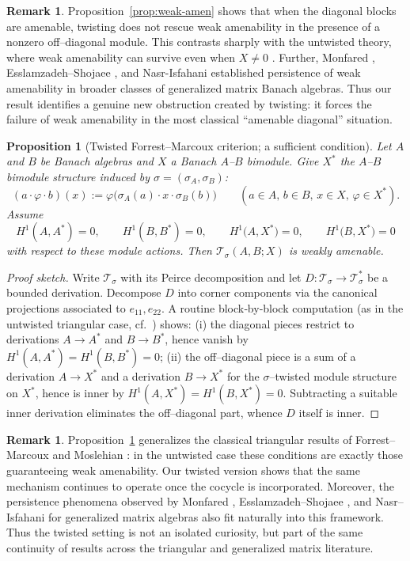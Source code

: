 \documentclass{article}
\theoremstyle{plain}
\newtheorem{prop}[theorem]{Proposition}
\theoremstyle{definition}
\newtheorem{remark}[theorem]{Remark}
\newcommand{\T}{\mathcal{T}}
\begin{document}
\begin{remark}
Proposition~\ref{prop:weak-amen} shows that when the diagonal blocks are
amenable, twisting does not rescue weak amenability in the presence of a
nonzero off--diagonal module.
This contrasts sharply with the untwisted theory, where weak amenability
can survive even when $X\neq 0$
\cite{ForrestMarcouxWA,MoslehianTriangular}.
Further, Monfared \cite{Monfared2008}, Esslamzadeh--Shojaee
\cite{EsslamzadehShojaee2011}, and Nasr-Isfahani \cite{NasrIsfahani2013}
established persistence of weak amenability in broader classes of
generalized matrix Banach algebras.
Thus our result identifies a genuine new obstruction created by twisting:
it forces the failure of weak amenability in the most classical
“amenable diagonal” situation.
\end{remark}
\begin{prop}[Twisted Forrest–Marcoux criterion; a sufficient condition]\label{prop:WA-sufficient}
Let $A$ and $B$ be Banach algebras and $X$ a Banach $A$--$B$ bimodule.
Give $X^*$ the $A$--$B$ bimodule structure induced by $\sigma=(\sigma_A,\sigma_B)$:
\[
(a\cdot\varphi\cdot b)(x):=\varphi\bigl(\sigma_A(a)\cdot x\cdot \sigma_B(b)\bigr)\qquad(a\in A,\,b\in B,\,x\in X,\,\varphi\in X^*).
\]
Assume
\[
H^1(A,A^*)=0,\qquad H^1(B,B^*)=0,\qquad H^1\bigl(A,X^*\bigr)=0,\qquad H^1\bigl(B,X^*\bigr)=0
\]
with respect to these module actions. Then $\T_\sigma(A,B;X)$ is weakly amenable.
\end{prop}

\begin{proof}[Proof sketch]
Write $\T_\sigma$ with its Peirce decomposition and let $D:\T_\sigma\to \T_\sigma^*$ be a bounded derivation.
Decompose $D$ into corner components via the canonical projections associated to $e_{11},e_{22}$.
A routine block‐by‐block computation (as in the untwisted triangular case, cf.\ \cite{ForrestMarcouxWA,MoslehianTriangular}) shows:
(i) the diagonal pieces restrict to derivations $A\to A^*$ and $B\to B^*$, hence vanish by $H^1(A,A^*)=H^1(B,B^*)=0$; 
(ii) the off–diagonal piece is a sum of a derivation $A\to X^*$ and a derivation $B\to X^*$ for the $\sigma$–twisted module structure on $X^*$, hence is inner by $H^1(A,X^*)=H^1(B,X^*)=0$.
Subtracting a suitable inner derivation eliminates the off–diagonal part, whence $D$ itself is inner.
\end{proof}
\begin{remark}
Proposition~\ref{prop:WA-sufficient} generalizes the classical triangular results
of Forrest--Marcoux \cite{ForrestMarcouxWA} and Moslehian \cite{MoslehianTriangular}:
in the untwisted case these conditions are exactly those guaranteeing weak
amenability. Our twisted version shows that the same mechanism continues to
operate once the cocycle is incorporated. Moreover, the persistence phenomena
observed by Monfared \cite{Monfared2008}, Esslamzadeh--Shojaee
\cite{EsslamzadehShojaee2011}, and Nasr--Isfahani \cite{NasrIsfahani2013} for
generalized matrix algebras also fit naturally into this framework. Thus the
twisted setting is not an isolated curiosity, but part of the same continuity
of results across the triangular and generalized matrix literature.
\end{remark}
\end{document}
